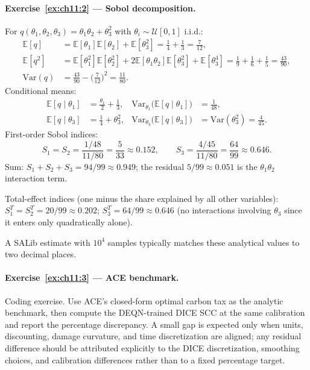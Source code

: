 \documentclass[11pt,a4paper]{report}
\begin{document}
\paragraph{Exercise~\ref{ex:ch11:2} --- Sobol decomposition.}
For $q(\theta_1, \theta_2, \theta_3) = \theta_1\theta_2 + \theta_3^2$ with $\theta_i \sim \mathcal{U}[0,1]$ i.i.d.:
\begin{align*}
   \mathbb{E}[q] &= \mathbb{E}[\theta_1]\mathbb{E}[\theta_2] + \mathbb{E}[\theta_3^2] = \tfrac{1}{4} + \tfrac{1}{3} = \tfrac{7}{12}, \\
   \mathbb{E}[q^2] &= \mathbb{E}[\theta_1^2]\mathbb{E}[\theta_2^2] + 2\mathbb{E}[\theta_1\theta_2]\mathbb{E}[\theta_3^2] + \mathbb{E}[\theta_3^4] = \tfrac{1}{9} + \tfrac{1}{6} + \tfrac{1}{5} = \tfrac{43}{90}, \\
   \mathrm{Var}(q) &= \tfrac{43}{90} - \bigl(\tfrac{7}{12}\bigr)^2 = \tfrac{11}{80}.
\end{align*}
Conditional means:
\begin{align*}
   \mathbb{E}[q \mid \theta_1] &= \tfrac{\theta_1}{2} + \tfrac{1}{3}, &
   \mathrm{Var}_{\theta_1}\bigl(\mathbb{E}[q\mid\theta_1]\bigr) &= \tfrac{1}{48},\\
   \mathbb{E}[q \mid \theta_3] &= \tfrac{1}{4} + \theta_3^2, &
   \mathrm{Var}_{\theta_3}\bigl(\mathbb{E}[q\mid\theta_3]\bigr) &= \mathrm{Var}(\theta_3^2) = \tfrac{4}{45}.
\end{align*}
First-order Sobol indices:
\[
   S_1 = S_2 = \frac{1/48}{11/80} = \frac{5}{33} \approx 0.152,
   \qquad
   S_3 = \frac{4/45}{11/80} = \frac{64}{99} \approx 0.646.
\]
Sum: $S_1 + S_2 + S_3 = 94/99 \approx 0.949$; the residual $5/99 \approx 0.051$ is the $\theta_1\theta_2$ interaction term.

Total-effect indices (one minus the share explained by all other variables): $S_1^T = S_2^T = 20/99 \approx 0.202$; $S_3^T = 64/99 \approx 0.646$ (no interactions involving $\theta_3$ since it enters only quadratically alone).

A SALib estimate with $10^4$ samples typically matches these analytical values to two decimal places.

\paragraph{Exercise~\ref{ex:ch11:3} --- ACE benchmark.}
Coding exercise.  Use ACE's closed-form optimal carbon tax as the analytic benchmark, then compute the DEQN-trained DICE SCC at the same calibration and report the percentage discrepancy.  A small gap is expected only when units, discounting, damage curvature, and time discretization are aligned; any residual difference should be attributed explicitly to the DICE discretization, smoothing choices, and calibration differences rather than to a fixed percentage target.
\end{document}
